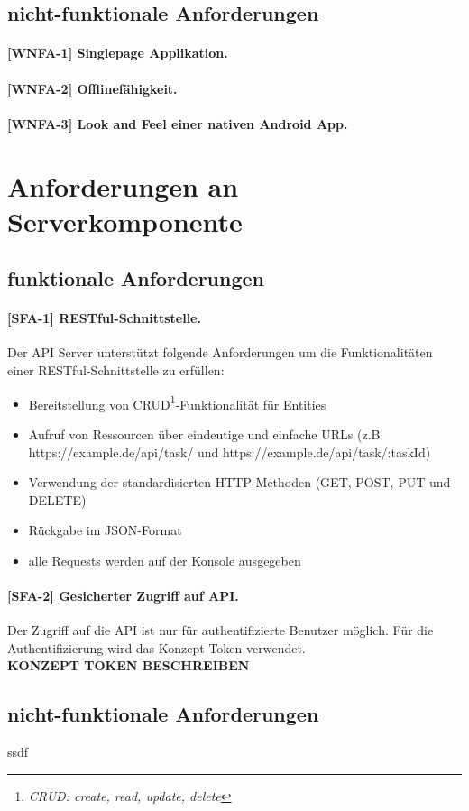 \newpage
\subsection{nicht-funktionale Anforderungen}

\paragraph{[WNFA-1] Singlepage Applikation.}

\paragraph{[WNFA-2] Offlinefähigkeit.}

\paragraph{[WNFA-3] Look and Feel einer nativen Android App.}\label{par_wnfa3}


\newpage
\section{Anforderungen an Serverkomponente}
\label{subsec_anforderungen_server}

\subsection{funktionale Anforderungen}

\paragraph{[SFA-1] RESTful-Schnittstelle. }Der API Server unterstützt folgende Anforderungen um die Funktionalitäten einer RESTful-Schnittstelle zu erfüllen:

\begin{itemize}  
\item Bereitstellung von CRUD\footnote{\textit{CRUD: create, read, update, delete}}-Funktionalität für Entities
\item Aufruf von Ressourcen über eindeutige und einfache URLs (z.B. https://example.de/api/task/ und https://example.de/api/task/:taskId) 
\item Verwendung der standardisierten HTTP-Methoden (GET, POST, PUT und DELETE) 
\item Rückgabe im JSON-Format
\item alle Requests werden auf der Konsole ausgegeben
\end{itemize}


\paragraph{[SFA-2] Gesicherter Zugriff auf API.} Der Zugriff auf die API ist nur für authentifizierte Benutzer möglich. Für die Authentifizierung wird das Konzept Token verwendet. \\
\textbf{KONZEPT TOKEN BESCHREIBEN}


\subsection{nicht-funktionale Anforderungen}
ssdf


